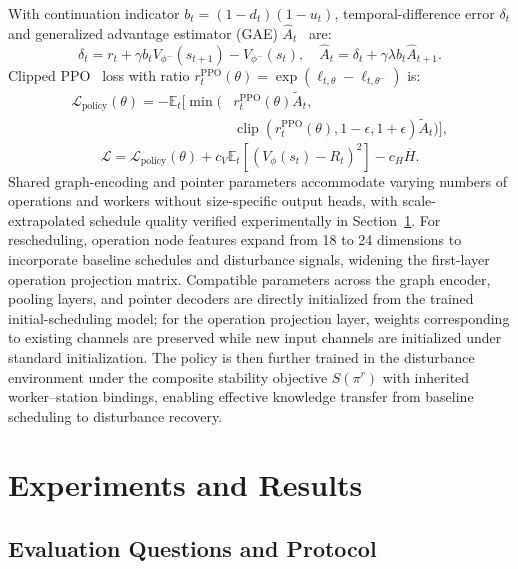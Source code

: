 \documentclass[journal,10pt]{IEEEtran}
\begin{document}
With continuation indicator $b_t=(1-d_t)(1-u_t)$, temporal-difference error $\delta_t$ and generalized advantage estimator (GAE) $\widehat A_t$~\cite{schulman2016} are:
\begin{equation}
\delta_t = r_t + \gamma b_t V_{\phi^-}(s_{t+1}) - V_{\phi^-}(s_t), \quad \widehat A_t = \delta_t + \gamma\lambda b_t \widehat A_{t+1}.
\end{equation}
Clipped PPO~\cite{schulman2017} loss with ratio $r_t^{\mathrm{PPO}}(\theta)=\exp(\ell_{t,\theta}-\ell_{t,\theta^-})$ is:
\begin{equation}
\begin{aligned}
\mathcal L_{\mathrm{policy}}(\theta) = -\mathbb E_t\Big[ \min\Big( &r_t^{\mathrm{PPO}}(\theta)\widetilde A_t, \\
&\operatorname{clip}(r_t^{\mathrm{PPO}}(\theta), 1-\epsilon, 1+\epsilon)\widetilde A_t \Big) \Big],
\end{aligned}
\end{equation}
\begin{equation}
\mathcal L = \mathcal L_{\mathrm{policy}}(\theta) + c_V \mathbb E_t[(V_\phi(s_t)-R_t)^2] - c_H \overline H.
\end{equation}
Shared graph-encoding and pointer parameters accommodate varying numbers of operations and workers without size-specific output heads, with scale-extrapolated schedule quality verified experimentally in Section~\ref{sec:experiments}. For rescheduling, operation node features expand from 18 to 24 dimensions to incorporate baseline schedules and disturbance signals, widening the first-layer operation projection matrix. Compatible parameters across the graph encoder, pooling layers, and pointer decoders are directly initialized from the trained initial-scheduling model; for the operation projection layer, weights corresponding to existing channels are preserved while new input channels are initialized under standard initialization. The policy is then further trained in the disturbance environment under the composite stability objective $S(\pi^r)$ with inherited worker--station bindings, enabling effective knowledge transfer from baseline scheduling to disturbance recovery.

\section{Experiments and Results}\label{sec:experiments}

\subsection{Evaluation Questions and Protocol}
\end{document}

